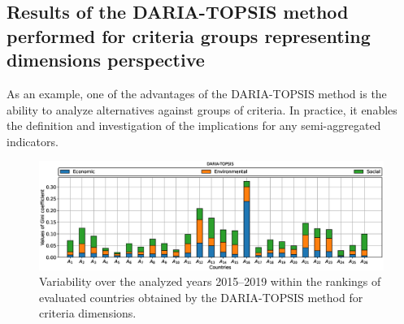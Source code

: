 \documentclass[5p,times]{elsarticle}
\newcounter{example}[section]
\begin{document}
\subsection{Results of the DARIA-TOPSIS method performed for criteria groups representing dimensions perspective}
\label{sec:resultsDimensions}
As an example, one of the advantages of the DARIA-TOPSIS method is the ability to analyze alternatives against groups of criteria. In practice, it enables the definition and investigation of the implications for any semi-aggregated indicators.
%
%
\begin{figure}[ht!]
    \centering
    \includegraphics[width=0.8\linewidth]{topsis_dims_Gini_coefficient.eps}
    \caption{Variability over the analyzed years 2015--2019 within the rankings of evaluated countries obtained by the DARIA-TOPSIS method for criteria dimensions.}
    \label{fig:RankingsVariabilityDimensionsTOPSIS}
\end{figure}
%
%
\end{document}
